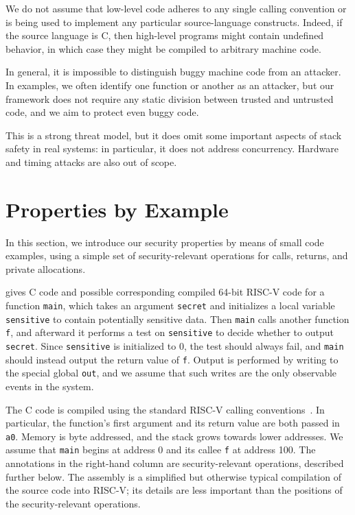 \documentclass[10pt,conference]{ieeetran}%
\theoremstyle{definition}
\begin{document}
We do not assume that low-level code adheres to any single calling
convention or is being used to implement any particular
source-language constructs.
Indeed, if the source language is C, then high-level programs might
contain undefined behavior, in which case they might be compiled to
arbitrary machine code.


In general, it is impossible to distinguish buggy machine code from an
attacker.  In examples, we often identify one function or another as
an attacker, but our framework does not require any static division between trusted
and untrusted code, and we aim to protect even buggy code.

This is a strong threat model, but it does omit some important aspects
of stack safety in real systems: in particular, it does not address
concurrency.  Hardware and timing attacks are also out of scope.
%

\section{Properties by Example}
\label{sec:example}

In this section, we introduce our security properties by means
of small code examples, using a simple set of security-relevant operations for
calls, returns, and private allocations.

 gives C code and possible corresponding compiled 64-bit RISC-V code
for a function {\tt main}, which
takes an argument {\tt secret} and initializes a local variable {\tt sensitive} to contain
potentially sensitive data.
Then {\tt main} calls another function {\tt f},
and afterward it performs a test on {\tt sensitive} to decide whether
to output {\tt secret}.  Since {\tt sensitive} is initialized to 0,
the test should always fail, and {\tt main} should instead output the return value of {\tt f}.
Output is performed by writing to the special global {\tt out},
and we assume that such writes are the only observable events in the system.

The C code is compiled using the standard RISC-V calling conventions~\cite{RISC-V-CC}.
In particular, the function's first argument and its
return value are both passed in {\tt a0}.
Memory is byte addressed, and the stack grows towards
lower addresses. We assume that {\tt main} begins at address 0 and its
callee {\tt f} at address 100. The annotations in the right-hand column are
security-relevant operations, described further below.
The assembly is a simplified but otherwise typical compilation of the
source code into RISC-V; its details are less important than the positions
of the security-relevant operations.
\end{document}
